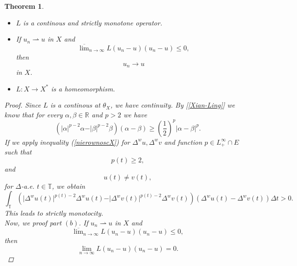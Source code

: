 \documentclass[12pt,a4paper,oneside,titlepage]{article}
\newtheorem{Twierdzenie}{Theorem}
\begin{document}
\begin{Twierdzenie} \label{operatorL_1}
\begin{itemize}
\item[(a)] $L$ is a continous and strictly monotone operator.
\item[(b)] If $u_n \rightharpoonup u$ in $X$ and
\begin{equation}
\nonumber
 \overline{\lim}_{n \rightarrow \infty} L(u_n-u)(u_n-u) \leq 0,
\end{equation} 
  then 
\begin{equation}
\nonumber
u_n \rightarrow u 
\end{equation}  
 in $X$.
\item[(c)] $L:X \rightarrow X^{*}$ is a homeomorphism.
\end{itemize}
\begin{proof}
Since $L$ is a continous at $\theta_{X}$, we have continuity. By [\ref{Xian-Ling}] we know that for every $\alpha, \beta \in \mathbb{R}$ and $p>2$ we have
\begin{equation}
\label{nierownoscX}
\left( \vert \alpha \vert^{p-2} \alpha - \vert \beta \vert^{p-2} \beta \right) \left( \alpha - \beta \right) \geq  \left( \frac{1}{2} \right)^{p} \vert \alpha - \beta \vert^{p}.
\end{equation}
If we apply inequality (\ref{nierownoscX}) for  $\Delta^{w}u, \Delta^{w} v$ and function $p \in L^{\infty}_{+} \cap E$ such that
\begin{equation}
\nonumber
p(t) \geq 2,
\end{equation}
and
\begin{equation}
\nonumber
u(t) \neq v(t),
\end{equation}
for $\Delta$-a.e. $t \in \mathbb{T}$, we obtain
\begin{equation}
\label{strictlyMonotone}
\int_{\mathbb{T}} \left( \vert \Delta^{w}u(t) \vert^{p(t)-2} \Delta^{w}u(t) - \vert \Delta^{w}v(t) \vert^{p(t)-2} \Delta^{w}v(t) \right) \left( \Delta^{w} u(t) -\Delta^{w} v(t) \right) \Delta t>0.  
\end{equation}
This leads to strictly monotocity. \\
\indent
Now, we proof part $(b)$. If $u_n \rightharpoonup u$ in $X$ and
\begin{equation}
\nonumber
\overline{\lim}_{n \rightarrow \infty} L(u_n-u)(u_n-u) \leq 0,
\end{equation}
then 
\begin{equation}
\lim_{n \rightarrow \infty} L(u_n-u)(u_n-u) = 0.
\end{equation}


\end{proof}
\end{Twierdzenie}
\end{document}
